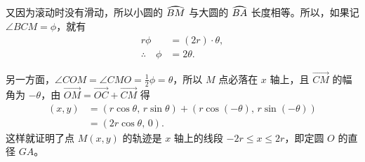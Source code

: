 又因为滚动时没有滑动，所以小圆的 $\arc{BM}$ 与大圆的 $\arc{BA}$ 长度相等。所以，如果记 $\angle BCM=\phi$，就有
\begin{align*}
  r\phi &= (2r)\cdot\theta, \\
  \therefore\quad \phi &= 2\theta.
\end{align*}

另一方面，$\angle COM = \angle CMO = \frac{1}{2}\phi = \theta$，所以 $M$ 点必落在 $x$ 轴上，且 $\overrightarrow{CM}$ 的幅角为 $-\theta$，由 $\overrightarrow{OM} = \overrightarrow{OC} + \overrightarrow{CM}$ 得
\begin{align*}
  (x, y) &= (r\cos\theta,\, r\sin\theta) + (r\cos(-\theta),\, r\sin(-\theta)) \\
         &= (2r\cos\theta,\, 0).
\end{align*}
这样就证明了点 $M(x, y)$ 的轨迹是 $x$ 轴上的线段 $-2r\leqslant x\leqslant 2r$，即定圆 $O$ 的直径 $GA$。
